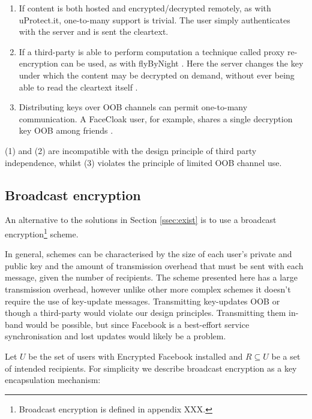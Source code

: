 \begin{enumerate}

    \item If content is both hosted and encrypted/decrypted remotely, as with uProtect.it, one-to-many support is trivial. The user simply authenticates with the server and is sent the cleartext.
    
    \item If a third-party is able to perform computation a technique called proxy re-encryption can be used, as with flyByNight \cite{flybynight}. Here the server changes the key under which the content may be decrypted on demand, without ever being able to read the cleartext itself \cite{proxy}.
    
    \item Distributing keys over OOB channels can permit one-to-many communication. A FaceCloak user, for example, shares a single decryption key OOB among friends \cite{facecloak}.

\end{enumerate}

(1) and (2) are incompatible with the design principle of third party independence, whilst (3) violates the principle of limited OOB channel use.

\FloatBarrier
\subsection{Broadcast encryption}

An alternative to the solutions in Section \ref{ssec:exist} is to use a broadcast encryption\footnote{Broadcast encryption is defined in appendix XXX.} scheme. 

In general, schemes can be characterised by the size of each user's private and public key and the amount of transmission overhead that must be sent with each message, given the number of recipients. The scheme presented here has a large transmission overhead, however unlike other more complex schemes it doesn't require the use of key-update messages. Transmitting key-updates OOB or though a third-party would violate our design principles. Transmitting them in-band would be possible, but since Facebook is a best-effort service synchronisation and lost updates would likely be a problem.

Let $U$ be the set of users with Encrypted Facebook installed and $R \subseteq U$ be a set of intended recipients. For simplicity we describe broadcast encryption as a key encapsulation mechanism:


